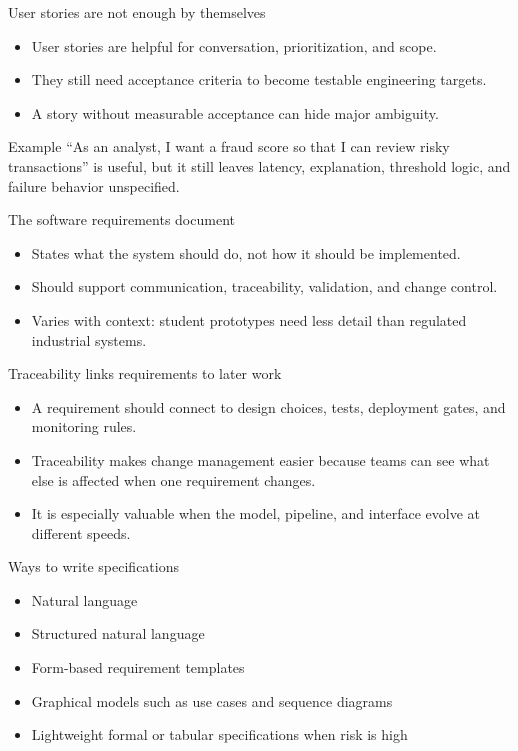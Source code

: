 \begin{frame}{User stories are not enough by themselves}
\begin{itemize}
\item User stories are helpful for conversation, prioritization, and scope.
\item They still need acceptance criteria to become testable engineering targets.
\item A story without measurable acceptance can hide major ambiguity.
\end{itemize}
\begin{block}{Example}
``As an analyst, I want a fraud score so that I can review risky transactions'' is useful, but it still leaves latency, explanation, threshold logic, and failure behavior unspecified.
\end{block}
\coursefooter
\end{frame}

\begin{frame}{The software requirements document}
\begin{itemize}
\item States what the system should do, not how it should be implemented.
\item Should support communication, traceability, validation, and change control.
\item Varies with context: student prototypes need less detail than regulated industrial systems.
\end{itemize}
\coursefooter
\end{frame}

\begin{frame}{Traceability links requirements to later work}
\begin{itemize}
\item A requirement should connect to design choices, tests, deployment gates, and monitoring rules.
\item Traceability makes change management easier because teams can see what else is affected when one requirement changes.
\item It is especially valuable when the model, pipeline, and interface evolve at different speeds.
\end{itemize}
\coursefooter
\end{frame}

\begin{frame}{Ways to write specifications}
\begin{itemize}
\item Natural language
\item Structured natural language
\item Form-based requirement templates
\item Graphical models such as use cases and sequence diagrams
\item Lightweight formal or tabular specifications when risk is high
\end{itemize}
\coursefooter
\end{frame}

